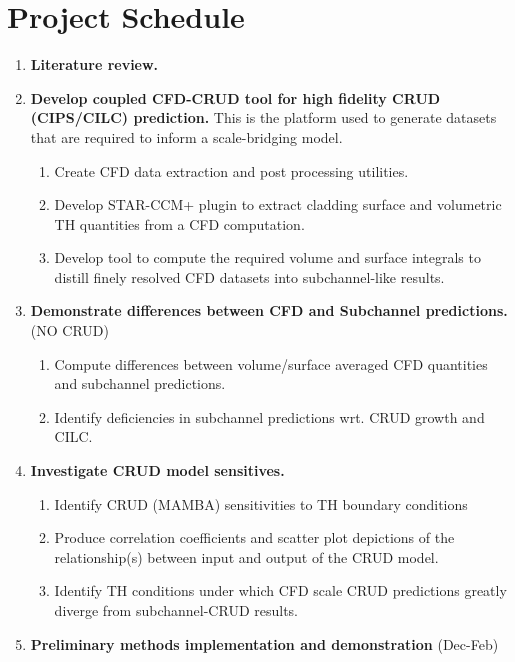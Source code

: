 \pagebreak
\section*{Project Schedule}

\begin{enumerate}
\item \textbf{Literature review.}
\item \textbf{Develop coupled CFD-CRUD tool for high fidelity CRUD (CIPS/CILC) prediction.}  
          This is the platform used to generate datasets that are
          required to inform a scale-bridging model.
    \begin{enumerate}
        \item Create CFD data extraction and post processing utilities.
        \item Develop STAR-CCM+ plugin to extract cladding surface and volumetric TH quantities from a CFD computation.
        \item Develop tool to compute the required volume and surface integrals to
              distill finely resolved CFD datasets into subchannel-like results.
    \end{enumerate}
\item \textbf{Demonstrate differences between CFD and Subchannel predictions.} (NO CRUD)
    \begin{enumerate}
        \item Compute differences between volume/surface averaged CFD quantities and subchannel predictions.
        \item Identify deficiencies in subchannel predictions wrt. CRUD growth and CILC.
    \end{enumerate}
\item \textbf{Investigate CRUD model sensitives.}
    \begin{enumerate}
        \item Identify CRUD (MAMBA) sensitivities to TH boundary conditions
        \item Produce correlation coefficients and scatter plot depictions of the relationship(s) between input
              and output of the CRUD model.
        \item Identify TH conditions under which CFD scale CRUD predictions greatly diverge from subchannel-CRUD results.
    \end{enumerate}
\item \textbf{Preliminary methods implementation and demonstration} (Dec-Feb)

\end{enumerate}
